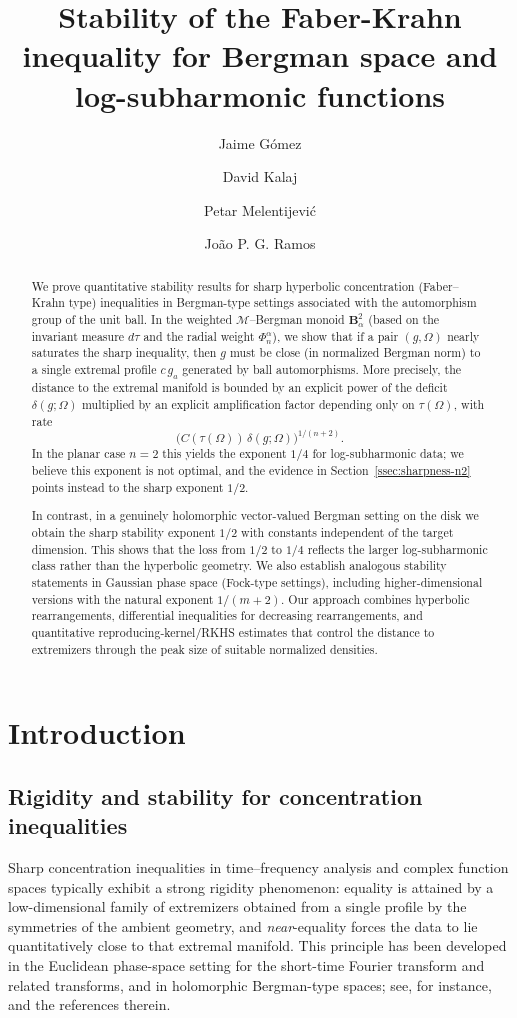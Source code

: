 \documentclass[a4paper,10pt]{amsart}
\title[Stability of the Faber-Krahn inequality]{Stability of the Faber-Krahn inequality for Bergman space and log-subharmonic functions}
\author{Jaime G\'omez}
\author{David Kalaj}
\author{Petar Melentijevi\'c}
\author{Jo\~ao P. G. Ramos}
\begin{document}
\begin{abstract}
We prove quantitative stability results for sharp hyperbolic concentration (Faber--Krahn type)
inequalities in Bergman-type settings associated with the automorphism group of the unit ball.
In the weighted $\mathcal M$--Bergman monoid $\mathbf B_\alpha^2$ (based on the invariant measure
$d\tau$ and the radial weight $\Phi_n^\alpha$), we show that if a pair $(g,\Omega)$ nearly saturates
the sharp inequality, then $g$ must be close (in normalized Bergman norm) to a single extremal
profile $c\,g_a$ generated by ball automorphisms. More precisely, the distance to the extremal
manifold is bounded by an explicit power of the deficit $\delta(g;\Omega)$ multiplied by an
explicit amplification factor depending only on $\tau(\Omega)$, with rate
\[
\bigl(C(\tau(\Omega))\,\delta(g;\Omega)\bigr)^{1/(n+2)}.
\]
In the planar case $n=2$ this yields the exponent $1/4$ for log-subharmonic data; we believe this
exponent is not optimal, and the evidence in Section~\ref{ssec:sharpness-n2} points instead to
the sharp exponent $1/2$.

In contrast, in a genuinely holomorphic vector-valued Bergman setting on the disk we obtain the
sharp stability exponent $1/2$ with constants independent of the target dimension. This shows that
the loss from $1/2$ to $1/4$ reflects the larger log-subharmonic class rather than the hyperbolic
geometry. We also establish analogous stability statements in Gaussian phase space (Fock-type
settings), including higher-dimensional versions with the natural exponent $1/(m+2)$.
Our approach combines hyperbolic rearrangements, differential inequalities for decreasing
rearrangements, and quantitative reproducing-kernel/RKHS estimates that control the distance to
extremizers through the peak size of suitable normalized densities.
\end{abstract}
\maketitle
\section{Introduction}

\subsection{Rigidity and stability for concentration inequalities}

Sharp concentration inequalities in time--frequency analysis and complex function spaces typically
exhibit a strong rigidity phenomenon: equality is attained by a low-dimensional family of
extremizers obtained from a single profile by the symmetries of the ambient geometry, and
\emph{near}-equality forces the data to lie quantitatively close to that extremal manifold.
This principle has been developed in the Euclidean phase-space setting for the short-time Fourier
transform and related transforms, and in holomorphic Bergman-type spaces; see, for instance,
\cite{GomezGuerraRamosTilli2024,GomezKalajMelentijevicRamos2025} and the references therein.
\end{document}
